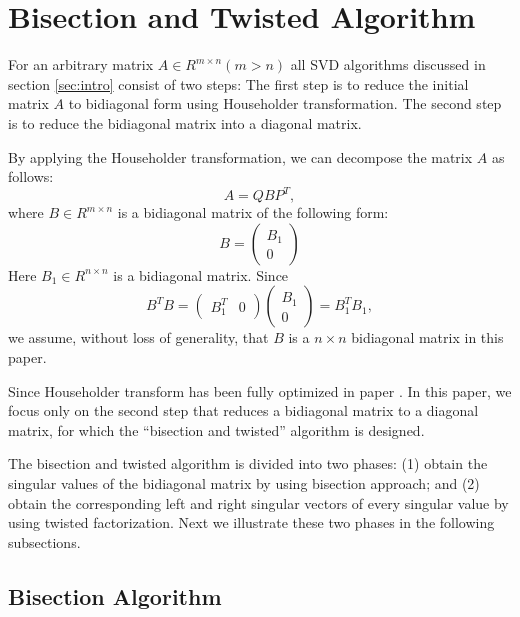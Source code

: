 \section{Bisection and Twisted Algorithm}
\label{sec:algorithm}
For an arbitrary matrix $A\in R^{m \times n} (m>n)$ all SVD algorithms discussed in section \ref{sec:intro} consist of two steps:
The first step is to reduce the initial matrix $A$ to bidiagonal form using Householder transformation.
The second step is to reduce the bidiagonal matrix into a diagonal matrix.

By applying the Householder transformation, we can decompose the matrix $A$ as follows:
\begin{equation}
\label{H-transform}
A = Q B P^T ,
\end{equation}
where $B \in R^{m \times n}$ is a bidiagonal matrix of the following form:
\begin{equation}
B = \left( \begin{array}{c}
      B_1 \\
      0  
\end{array} \right) 
\end{equation}
Here $B_1 \in R^{n \times n}$ is a bidiagonal matrix. Since 
\[
B^T B = \left( \begin{array}{cc }B_1^T & 0 \end{array} \right) \left( \begin{array}{c} B_1 \\ 0  \end{array} \right) = B_1^T B_1,
\]
we assume, without loss of generality, that $B$ is a $n \times n$ bidiagonal matrix in this paper.
 
Since Householder transform has been fully optimized in paper \cite{LiuHouseholder}.
In this paper, we focus only on the second step that reduces a bidiagonal matrix to a diagonal matrix, for which the  ``bisection and twisted'' algorithm is designed.

The bisection and twisted algorithm is divided into two phases:
(1) obtain the singular values of the bidiagonal matrix by using bisection approach; and
(2) obtain the corresponding left and right singular vectors of every singular value by using twisted factorization.
Next we illustrate these two phases in the following subsections.

\subsection{Bisection Algorithm}

